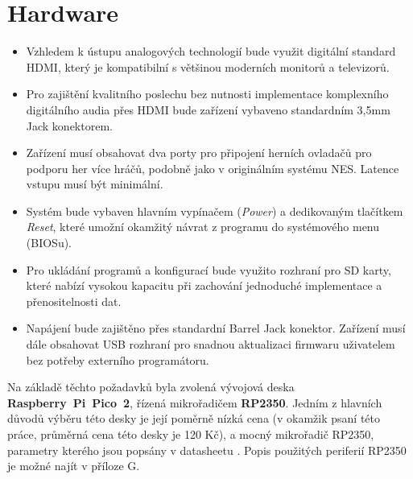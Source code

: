 \begin{itemize}
\end{itemize}

\section{Hardware}

\begin{itemize}
    \item Vzhledem k ústupu analogových technologií bude využit digitální standard HDMI, který je
        kompatibilní s většinou moderních monitorů a televizorů.
    \item Pro zajištění kvalitního poslechu bez nutnosti implementace komplexního digitálního audia
        přes HDMI bude zařízení vybaveno standardním 3,5mm Jack konektorem.
    \item Zařízení musí obsahovat dva porty pro připojení herních ovladačů pro podporu her
        více hráčů, podobně jako v originálním systému NES. Latence vstupu musí být minimální.
    \item Systém bude vybaven hlavním vypínačem (\textit{Power}) a dedikovaným tlačítkem
        \textit{Reset}, které umožní okamžitý návrat z programu do systémového menu (BIOSu).
    \item Pro ukládání programů a konfigurací bude využito rozhraní pro SD karty, které nabízí
        vysokou kapacitu při zachování jednoduché implementace a přenositelnosti dat.
    \item Napájení bude zajištěno přes standardní Barrel Jack konektor. Zařízení musí dále obsahovat
        USB rozhraní pro snadnou aktualizaci firmwaru uživatelem bez potřeby externího programátoru.
\end{itemize}

Na základě těchto požadavků byla zvolená vývojová deska \textbf{Raspberry~Pi~Pico~2}, řízená
mikrořadičem \textbf{RP2350}. Jedním z hlavních důvodů výběru této desky je její poměrně nízká cena
(v okamžik psaní této práce, průměrná cena této desky je 120 Kč), a mocný mikrořadič RP2350,
parametry kterého jsou popsány v datasheetu \cite{rp2350-datasheet}. Popis použitých periferií
RP2350 je možné najít v příloze G.

